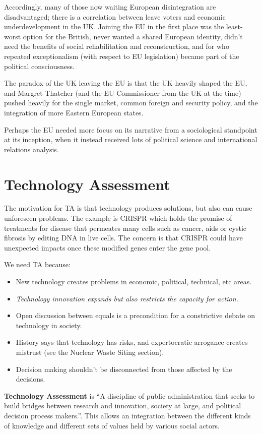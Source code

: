 Accordingly, many of those now waiting European disintegration are
disadvantaged; there is a correlation between leave voters and
economic underdevelopment in the UK. Joining the EU in the first place
was the least-worst option for the British, never wanted a shared
European identity, didn't need the benefits of social rehabilitation
and reconstruction, and for who repeated exceptionalism (with respect
to EU legislation) became part of the political consciousness.

The paradox of the UK leaving the EU is that the UK heavily shaped the
EU, and Margret Thatcher (and the EU Commissioner from the UK at the
time) pushed heavily for the single market, common foreign and
security policy, and the integration of more Eastern European states.

Perhaps the EU needed more focus on its narrative from a sociological
standpoint at its inception, when it instead received lots of
political science and international relations analysis.

\section{Technology Assessment}

The motivation for TA is that technology produces solutions, but also
can cause unforeseen problems. The example is CRISPR which holds the
promise of treatments for disease that permeates many cells such as
cancer, aids or cystic fibrosis by editing DNA in live cells. The
concern is that CRISPR could have unexpected impacts once these
modified genes enter the gene pool.

We need TA because:
\begin{itemize}
  \item New technology creates problems in economic, political,
    technical, etc areas.
  \item \textit{Technology innovation expands but also restricts the
    capacity for action.}
  \item Open discussion between equals is a precondition for a
    constrictive debate on technology in society.
  \item History says that technology has risks, and expertocratic
    arrogance creates mistrust (see the Nuclear Waste Siting section).
  \item Decision making shouldn't be disconnected from those affected
    by the decisions.
\end{itemize}

\textbf{Technology Assessment} is ``A discipline of public
administration that seeks to build bridges between research and
innovation, society at large, and political decision process
makers.''. This allows an integration between the different kinds of
knowledge and different sets of values held by various social actors.

